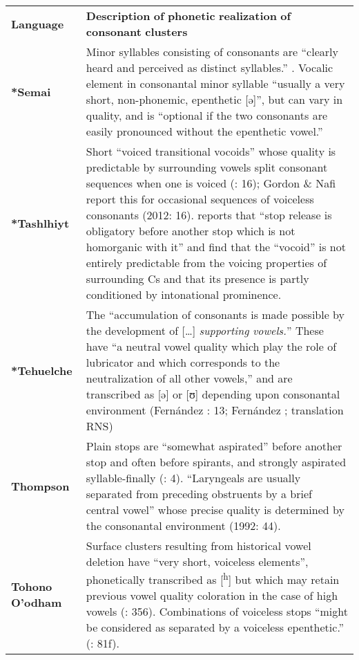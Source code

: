 \begin{table}
\begin{tabularx}{\textwidth}{XX}
\lsptoprule

\textbf{Language} & \textbf{Description} \textbf{of} \textbf{phonetic} \textbf{realization} \textbf{of} \textbf{consonant} \textbf{clusters}\\
\textbf{*Semai} & Minor syllables consisting of consonants are “clearly heard and perceived as distinct syllables.” \citep[321]{Sloan1988}. Vocalic element in consonantal minor syllable “usually a very short, non-phonemic, epenthetic [ə]”, but can vary in quality, and is “optional if the two consonants are easily pronounced without the epenthetic vowel.” \citep[2]{Philips2007}\\
\textbf{*Tashlhiyt} & Short “voiced transitional vocoids” whose quality is predictable by surrounding vowels split consonant sequences when one is voiced (\citealt{DellElmedlaoui2002}: 16); Gordon \& Nafi report this for occasional sequences of voiceless consonants (2012: 16). \citet[210]{Ridouane2008} reports that “stop release is obligatory before another stop which is not homorganic with it” and \citet{GriceEtAl2015} find that the “vocoid” is not entirely predictable from the voicing properties of surrounding Cs and that its presence is partly conditioned by intonational prominence.\\
\textbf{*Tehuelche} & The “accumulation of consonants is made possible by the development of […] \textit{supporting} \textit{vowels.}” These have “a neutral vowel quality which play the role of lubricator and which corresponds to the neutralization of all other vowels,” and are transcribed as [ə] or [ʊ] depending upon consonantal environment (Fernández \citealt{GarayHernández2006}: 13; Fernández \citealt{Garay1998}; translation RNS)\\
\textbf{Thompson} & Plain stops are “somewhat aspirated” before another stop and often before spirants, and strongly aspirated syllable-finally (\citealt{ThompsonThompson1992}: 4). “Laryngeals are usually separated from preceding obstruents by a brief central vowel” whose precise quality is determined by the consonantal environment (1992: 44).\\
\textbf{Tohono} \textbf{O’odham} & Surface clusters resulting from historical vowel deletion have “very short, voiceless elements”, phonetically transcribed as [\textsuperscript{h}] but which may retain previous vowel quality coloration in the case of high vowels (\citealt{HillZepeda1992}: 356). Combinations of voiceless stops “might be considered as separated by a voiceless epenthetic.” (\citealt{Mason1950}: 81f).\\

\end{tabularx}
\end{table}
